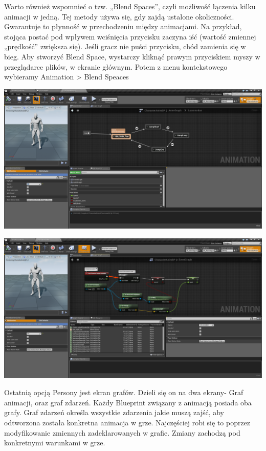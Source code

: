 \documentclass[brudnopis]{xmgr}
\begin{document}
Warto również wspomnieć o tzw. „Blend Spaces”, czyli możliwość łączenia kilku animacji w jedną. Tej metody używa się, gdy zajdą ustalone okoliczności. Gwarantuje to płynność w przechodzeniu między animacjami. Na przykład, stojąca postać pod wpływem wciśnięcia przycisku zaczyna iść (wartość zmiennej „prędkość” zwiększa się). Jeśli gracz nie puści przycisku, chód zamienia się w bieg.
Aby stworzyć Blend Space, wystarczy kliknąć prawym przyciskiem myszy w przeglądarce plików, w ekranie głównym. Potem z menu kontekstowego wybieramy Animation > Blend Speaces

\includegraphics[scale=0.25]{Screeny/AnimGraph_Event}

\includegraphics[scale=0.25]{Screeny/EventGraph_Event}

Ostatnią opcją Persony jest ekran grafów. Dzieli się on na dwa ekrany- Graf animacji, oraz graf zdarzeń. Każdy Blueprint związany z animacją posiada oba grafy.
Graf zdarzeń określa wszystkie zdarzenia jakie muszą zajść, aby odtworzona została konkretna animacja w grze. Najczęściej robi się to poprzez modyfikowanie zmiennych zadeklarowanych w grafie. Zmiany zachodzą pod konkretnymi warunkami w grze.
\end{document}
